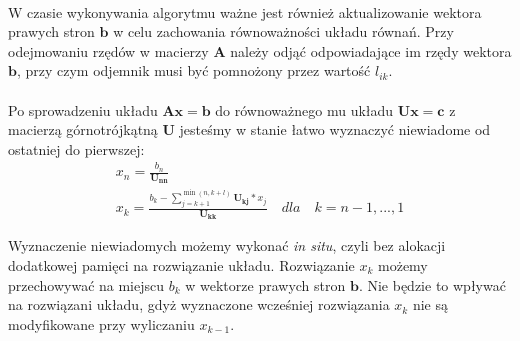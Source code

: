 \documentclass[a4paper]{article}
\begin{document}
\paragraph{}
W czasie wykonywania algorytmu ważne jest również aktualizowanie wektora prawych stron $\mathbf{b}$ w celu zachowania równoważności układu równań. Przy odejmowaniu rzędów w macierzy $\mathbf{A}$ należy odjąć odpowiadające im rzędy wektora $\mathbf{b}$, przy czym odjemnik musi być pomnożony przez wartość $l_{i k}$.

\paragraph{}
Po sprowadzeniu układu $\mathbf{Ax = b}$ do równoważnego mu układu $\mathbf{Ux = c}$ z macierzą górnotrójkątną $\mathbf{U}$ jesteśmy w stanie łatwo wyznaczyć niewiadome od ostatniej do pierwszej:
\begin{equation}
\begin{split}
x_{n} = \frac{b_{n}}{\mathbf{U_{n n}}}\\
x_{k} = \frac{b_{k} - \sum_{j=k+1}^{\min(n, k + l)} \mathbf{U_{k j}}*x_{j}}{\mathbf{U_{k k}}} \quad dla \quad k = n - 1, ..., 1
\end{split}
\end{equation}

Wyznaczenie niewiadomych możemy wykonać \textit{in situ}, czyli bez alokacji dodatkowej pamięci na rozwiązanie układu. Rozwiązanie $x_{k}$ możemy przechowywać na miejscu $b_{k}$ w wektorze prawych stron $\mathbf{b}$. Nie będzie to wpływać na rozwiązani układu, gdyż wyznaczone wcześniej rozwiązania $x_{k}$ nie są modyfikowane przy wyliczaniu $x_{k - 1}$.
\end{document}
